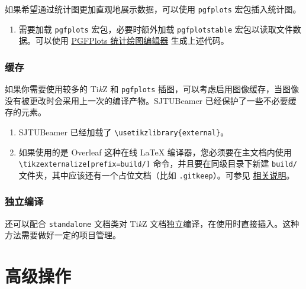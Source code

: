 \documentclass[
    UTF8,
    heading=true,
    12pt,
    a4paper
]{ctexrep}
\newenvironment{commentlist}
{\begin{enumerate}\small}
{\end{enumerate}}
\newcommand{\cls}[1]{\texttt{#1}}
\newcommand{\pkg}[1]{\texttt{#1}}
\def\themename{\textsf{SJTUBeamer}}
\begin{document}
如果希望通过统计图更加直观地展示数据，可以使用 \pkg{pgfplots} 宏包插入统计图。


\begin{commentlist}
  \item 需要加载 \pkg{pgfplots} 宏包，必要时额外加载
  \pkg{pgfplotstable} 宏包以读取文件数据。可以使用
  \href{https://logcreative.github.io/PGFPlotsEdt/}{PGFPlots 统计绘图编辑器}
  生成上述代码。
\end{commentlist}

\section{缓存}

如果你需要使用较多的 Ti\emph{k}Z 和 \pkg{pgfplots}
插图，可以考虑启用图像缓存，当图像没有被更改时会采用上一次的编译产物。\themename{}
已经保护了一些不必要缓存的元素。


\begin{commentlist}
  \item \themename{} 已经加载了
  \verb"\usetikzlibrary{external}"。
  \item[\faExclamationTriangle] 如果使用的是 Overleaf
  这种在线 \LaTeX{} 编译器，您必须要在主文档内使用
  \verb"\tikzexternalize[prefix=build/]" 命令，并且要在同级目录下新建
  \verb"build/" 文件夹，其中应该还有一个占位文档（比如
  \verb".gitkeep"）。可参见
  \href{https://www.overleaf.com/learn/latex/Questions/I_have_a_lot_of_tikz%2C_matlab2tikz_or_pgfplots_figures%2C_so_I%27m_getting_a_compilation_timeout._Can_I_externalise_my_figures%3F}{相关说明}。
\end{commentlist}

\section{独立编译}

还可以配合 \cls{standalone} 文档类对 Ti\emph{k}Z
文档独立编译，在使用时直接插入。这种方法需要做好一定的项目管理。


\part{高级操作}
\end{document}
